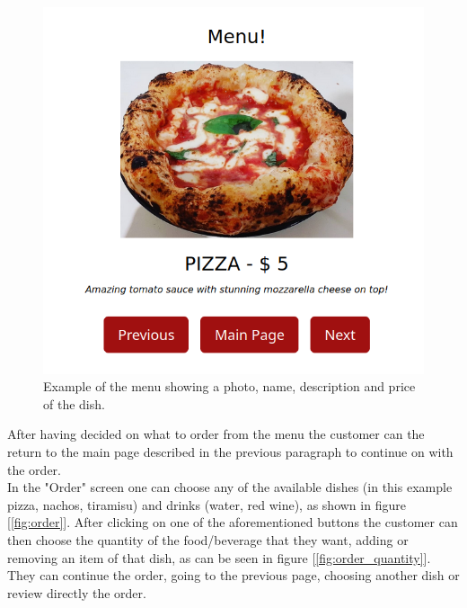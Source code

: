 \documentclass[12pt, letterpaper, twoside]{article}
\begin{document}
\begin{figure}[h]
	\centerline{\includegraphics[scale=.4]{img/pizza.png}}
	\caption{Example of the menu showing a photo, name, description and price of the dish.}
	\label{fig:menu}
\end{figure}

\newpage

After having decided on what to order from the menu the customer can the return to the main page described in the previous paragraph to continue on with the order. \\
In the "Order" screen one can choose any of the available dishes (in this example pizza, nachos, tiramisu) and drinks (water, red wine), as shown in figure [\ref{fig:order}]. After clicking on one of the aforementioned	buttons the customer can then choose the quantity of the food/beverage that they want, adding or removing an item of that dish, as can be seen in figure [\ref{fig:order_quantity}]. They can continue the order, going to the previous page, choosing another dish or review directly the order.

\
\end{document}
